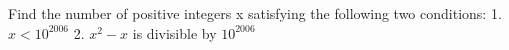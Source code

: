 Find the number of positive integers x satisfying the following two conditions:
1. $x<10^{2006}$
2. $x^{2}-x$ is divisible by $10^{2006}$